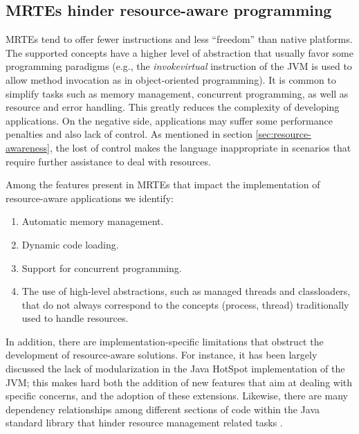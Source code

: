 \subsection{MRTEs hinder resource-aware programming}

MRTEs tend to offer fewer instructions and less ``freedom'' than native platforms.
The supported concepts have a higher level of abstraction that usually favor some programming paradigms (e.g., the \textit{invokevirtual} instruction of the JVM is used to allow method invocation as in object-oriented programming).
It is common to simplify tasks such as memory management, concurrent programming, as well as resource and error handling.
This greatly reduces the complexity of developing applications.
On the negative side, applications may suffer some performance penalties and also lack of control.
As mentioned in section \ref{sec:resource-awareness}, the lost of control makes the language inappropriate in scenarios that require further assistance to deal with resources.

Among the features present in MRTEs that impact the implementation of resource-aware applications we identify:
\begin{enumerate}
\item Automatic memory management.
\item Dynamic code loading.
\item Support for concurrent programming.
\item The use of high-level abstractions, such as managed threads and classloaders,  that do not always correspond to the concepts (process, thread) traditionally used to handle resources.
\end{enumerate}
In addition, there are implementation-specific limitations that obstruct the development of resource-aware solutions.
For instance, it has been largely discussed \cite{Doyle2002,Fong:2004:PVM:1028976.1029010,1420998} the lack of modularization in the Java HotSpot implementation of the JVM; this makes hard both the addition of new features that aim at dealing with specific concerns, and the adoption of these extensions.
Likewise, there are many dependency relationships among different sections of code within the Java standard library that hinder resource management related tasks \cite{Blackburn2008,Kell:2012:JOE:2414740.2414747}.

%
%
%
%
%

